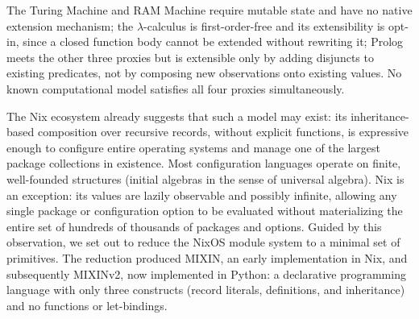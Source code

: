 \noindent
The Turing Machine and RAM Machine require mutable state and have no native
extension mechanism;
the $\lambda$-calculus is first-order-free and its extensibility is opt-in,
since a closed function body cannot be extended without rewriting it;
Prolog meets the other three proxies but is extensible only by adding
disjuncts to existing predicates, not by composing new observations onto
existing values.
No known computational model satisfies all four proxies simultaneously.

The Nix ecosystem already suggests that such a model may exist:
its inheritance-based composition over recursive records, without
explicit functions, is expressive enough to configure entire
operating systems and manage one of the largest package
collections in existence.
Most configuration languages operate on finite, well-founded
structures (initial algebras in the sense of universal algebra).
Nix is an exception: its values are lazily observable
and possibly infinite, allowing any single package or
configuration option to be evaluated without materializing the
entire set of hundreds of thousands of packages and options.
Guided by this observation, we set out to reduce the
NixOS module system to a minimal set of primitives.
The reduction produced MIXIN, an early implementation in Nix,
and subsequently
MIXINv2, now implemented in Python: a declarative programming
language with only three constructs (record literals, definitions,
and inheritance) and no functions or let-bindings.

